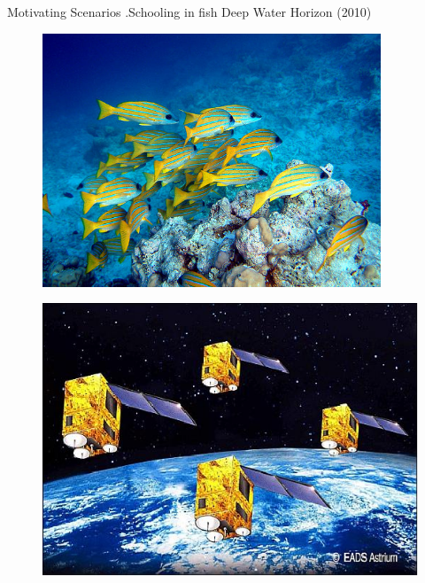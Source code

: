 \begin{frame}{Motivating Scenarios}
    .\hspace{0.2cm}Schooling in fish
    \hspace{2.1 cm}
    Deep Water Horizon (2010)
    \\
	\begin{minipage}{0.45\textwidth}	
		\begin{figure}
			\includegraphics[width=0.9\textwidth]{figures/schooling_fish.jpg}
		\end{figure}
		\begin{figure}
			\includegraphics[scale=0.2]{figures/Essaim_constellation.jpg}\label{fig:satellite_flock}

\end{figure}
\end{minipage}
\end{frame}
